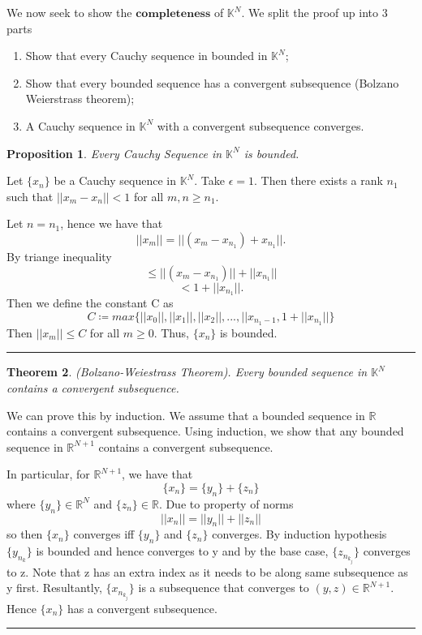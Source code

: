 \documentclass[twoside]{article}
\newcounter{lecnum}
\newtheorem{theorem}{Theorem}[lecnum]
\newtheorem{proposition}[theorem]{Proposition}
\newenvironment{proof}{{\bf Proof:}}{\hfill\rule{2mm}{2mm}}
\begin{document}
We now seek to show the $\textbf{completeness}$ of $\mathbb{K}^N$. We split the proof up into 3 parts
\begin{enumerate}
  \item Show that every Cauchy sequence in bounded in $\mathbb{K}^N$;
  \item Show that every bounded sequence has a convergent subsequence (Bolzano Weierstrass theorem);
  \item A Cauchy sequence in $\mathbb{K}^N$ with a convergent subsequence converges.
\end{enumerate}

\begin{proposition}
Every Cauchy Sequence in $\mathbb{K}^N$ is bounded.
\end{proposition}

\begin{proof}
Let $\{x_n\}$ be a Cauchy sequence in $\mathbb{K}^N$. Take $\epsilon = 1$. Then there exists a rank $n_1$ such that $||x_m - x_n|| < 1$ for all $m,n \geq n_1$. 

Let $n = n_1$, hence we have that
$$
||x_m|| = ||(x_m - x_{n_1}) + x_{n_1}||.
$$
By triange inequality
$$
\leq ||(x_m - x_{n_1}) || + ||x_{n_1}||
$$
$$
< 1 + ||x_{n_1}||.
$$
Then we define the constant C as 
$$
C \coloneqq max\{||x_0||, ||x_1||, ||x_2||,...,||x_{n_1 - 1}, 1 + ||x_{n_1}||\}
$$
Then $||x_m|| \leq C$ for all $m \geq 0$. Thus, $\{x_n\}$ is bounded.
\end{proof}

\begin{theorem}
(Bolzano-Weiestrass Theorem). Every bounded sequence in $\mathbb{K}^N$ contains a convergent subsequence.
\end{theorem}

\begin{proof}
We can prove this by induction. We assume that a bounded sequence in $\mathbb{R}$ contains a convergent subsequence. Using induction, we show that any bounded sequence in $\mathbb{R}^{N+1}$ contains a convergent subsequence.

In particular, for $\mathbb{R}^{N+1}$, we have that
$$
\{x_n\} = \{y_n\} + \{z_n\}
$$
where $\{y_n\} \in \mathbb{R}^N$ and $\{z_n\} \in \mathbb{R}$. Due to property of norms
$$
||x_n|| = ||y_n|| + ||z_n||
$$
so then $\{x_n\}$ converges iff $\{y_n\}$ and $\{z_n\}$ converges. By induction hypothesis $\{y_{n_k}\}$ is bounded and hence converges to y and by the base case, $\{z_{n_{k_j}}\}$ converges to z. Note that z has an extra index as it needs to be along same subsequence as y first. Resultantly, $\{x_{n_{k_j}}\}$ is a subsequence that converges to $(y,z) \in \mathbb{R}^{N+1}$. Hence $\{x_n\}$ has a convergent subsequence.
\end{proof}
\end{document}
